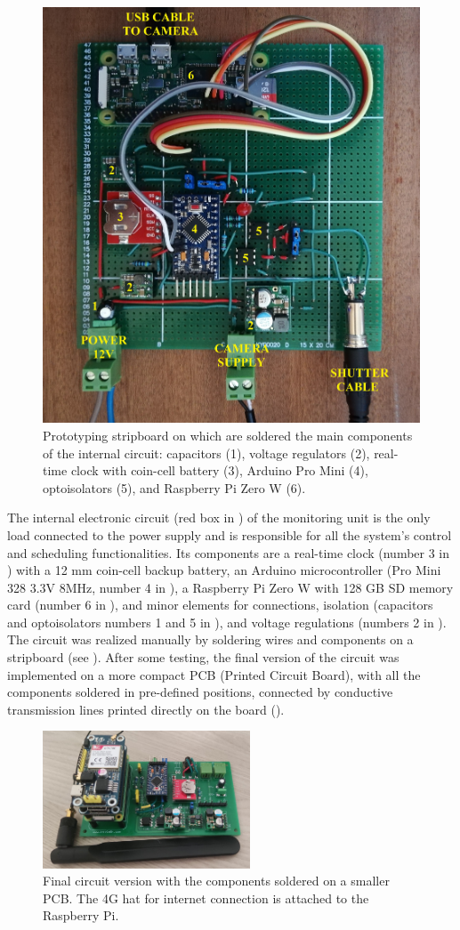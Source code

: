 \begin{figure}[ht!]
  \centering
    \includegraphics[width=.6\textwidth]{board.jpg}
  \caption{Prototyping stripboard on which are soldered the main components of the internal circuit: capacitors (1), voltage regulators (2), real-time clock with coin-cell battery (3), Arduino Pro Mini (4), optoisolators (5), and Raspberry Pi Zero W (6).}
  \label{fig:4:circuit}
\end{figure}

The internal electronic circuit (red box in ) of the monitoring unit is the only load connected to the power supply and is responsible for all
the system's control and scheduling functionalities.
Its components are a real-time clock (number 3 in ) with a 12 mm coin-cell backup battery, an Arduino microcontroller (Pro  Mini 328 3.3V 8MHz, number 4 in ), a Raspberry Pi Zero W with 128 GB SD memory card (number 6 in ), and minor elements for connections, isolation (capacitors and optoisolators numbers 1 and 5 in ), and voltage regulations (numbers 2 in ).
The circuit was realized manually by soldering wires and components on a stripboard (see ).
After some testing, the final version of the circuit was implemented on a more compact PCB (Printed Circuit Board), with all the components soldered in pre-defined positions, connected by conductive transmission lines printed directly on the board ().

\begin{figure}[ht!]
  \centering 
  \includegraphics[width=0.55\textwidth]{board_final.jpg}
  \caption{Final circuit version with the components soldered on a smaller PCB. The 4G hat for internet connection is attached to the Raspberry Pi.}
  \label{fig:4:circuit_final}
\end{figure}

